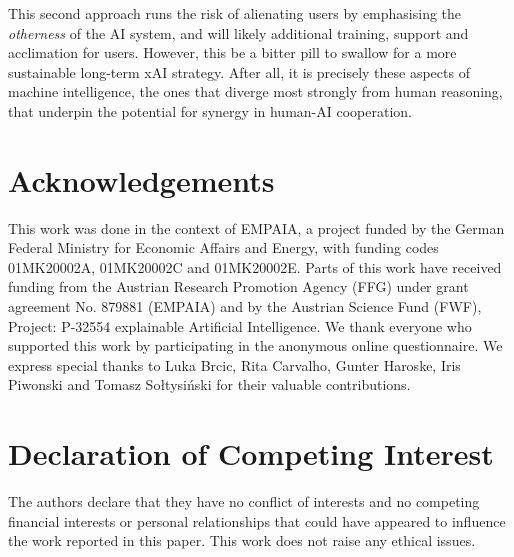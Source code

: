 \documentclass[final,5p,times,twocolumn,hyphens]{elsarticle}
\begin{document}
This second approach runs the risk of alienating users by emphasising the \textit{otherness} of the AI system, and will likely additional training, support and acclimation for users. However, this be a bitter pill to swallow for a more sustainable long-term xAI strategy. After all, it is precisely these aspects of machine intelligence, the ones that diverge most strongly from human reasoning, that underpin the potential for synergy in human-AI cooperation.

\section*{Acknowledgements}

This work was done in the context of EMPAIA, a project funded by the German Federal Ministry for Economic Affairs and Energy, with funding codes 01MK20002A, 01MK20002C and 01MK20002E. Parts of this work have received funding from the Austrian Research Promotion Agency (FFG) under grant agreement No. 879881 (EMPAIA) and by the Austrian Science Fund (FWF), Project: P-32554 explainable Artificial Intelligence. We thank everyone who supported this work by participating in the anonymous online questionnaire. We express special thanks to Luka Brcic, Rita Carvalho, Gunter Haroske, Iris Piwonski and Tomasz Sołtysiński for their valuable contributions. 

\section*{Declaration of Competing Interest}

The authors declare that they have no conflict of interests and no competing financial interests or personal relationships that could have appeared to influence the work reported in this paper. This work does not raise any ethical issues.


\end{document}
